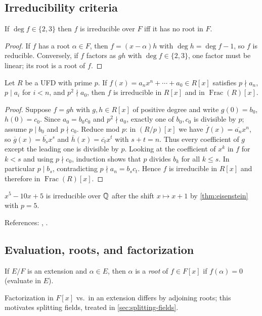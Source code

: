 \subsection{Irreducibility criteria}
\begin{proposition}[Degree $2$ or $3$]
If $\deg f\in\{2,3\}$ then $f$ is irreducible over $F$ iff it has no root in $F$.
\end{proposition}
\begin{proof}
If $f$ has a root $\alpha\in F$, then $f=(x-\alpha)h$ with $\deg h=\deg f-1$, so $f$ is reducible.
Conversely, if $f$ factors as $gh$ with $\deg f\in\{2,3\}$, one factor must be linear; its root is a root of $f$.
\end{proof}
\begin{theorem}[Eisenstein]\label{thm:eisenstein}
Let $R$ be a UFD with prime $p$. If $f(x)=a_nx^n+\cdots+a_0\in R[x]$ satisfies $p\nmid a_n$, $p\mid a_i$ for $i<n$, and $p^2\nmid a_0$, then $f$ is irreducible in $R[x]$ and in $\operatorname{Frac}(R)[x]$.
\end{theorem}
\begin{proof}
Suppose $f=gh$ with $g,h\in R[x]$ of positive degree and write $g(0)=b_0$, $h(0)=c_0$.
Since $a_0=b_0c_0$ and $p^2\nmid a_0$, exactly one of $b_0,c_0$ is divisible by $p$; assume $p\mid b_0$ and $p\nmid c_0$.
Reduce mod $p$: in $(R/p)[x]$ we have $\overline{f}(x)=\overline{a_n}x^n$, so $\overline{g}(x)=\overline{b_s}x^s$ and $\overline{h}(x)=\overline{c_t}x^t$ with $s+t=n$.
Thus every coefficient of $g$ except the leading one is divisible by $p$.
Looking at the coefficient of $x^k$ in $f$ for $k<s$ and using $p\nmid c_0$, induction shows that $p$ divides $b_k$ for all $k\le s$.
In particular $p\mid b_s$, contradicting $p\nmid a_n=b_sc_t$.
Hence $f$ is irreducible in $R[x]$ and therefore in $\operatorname{Frac}(R)[x]$.
\end{proof}
\begin{example}
$x^5-10x+5$ is irreducible over $\mathbb{Q}$ after the shift $x\mapsto x+1$ by \cref{thm:eisenstein} with $p=5$.
\end{example}
References: \cite[\S9--11]{DF}, \cite[Ch.~II]{Lang}.

\subsection{Evaluation, roots, and factorization}
\begin{definition}
If $E/F$ is an extension and $\alpha\in E$, then $\alpha$ is a \emph{root} of $f\in F[x]$ if $f(\alpha)=0$ (evaluate in $E$).
\end{definition}
\begin{remark}
Factorization in $F[x]$ vs.\ in an extension differs by adjoining roots; this motivates splitting fields, treated in \cref{sec:splitting-fields}.
\end{remark}
